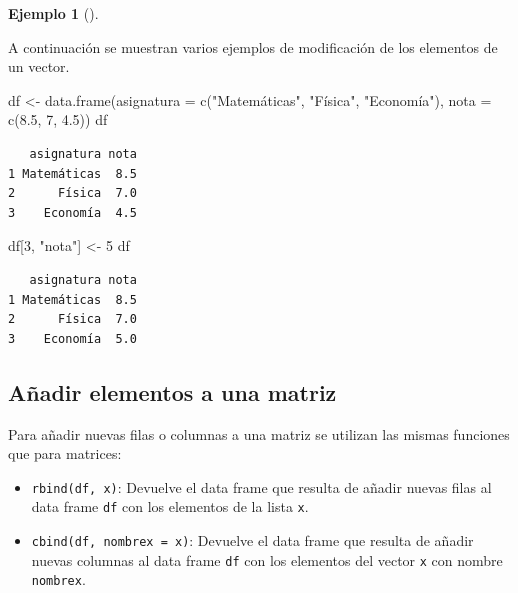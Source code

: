 \documentclass[
  a4paper,
]{scrreport}
\newenvironment{Shaded}{\begin{snugshade}}{\end{snugshade}}
\newcommand{\AttributeTok}[1]{\textcolor[rgb]{0.40,0.45,0.13}{#1}}
\newcommand{\DecValTok}[1]{\textcolor[rgb]{0.68,0.00,0.00}{#1}}
\newcommand{\FloatTok}[1]{\textcolor[rgb]{0.68,0.00,0.00}{#1}}
\newcommand{\FunctionTok}[1]{\textcolor[rgb]{0.28,0.35,0.67}{#1}}
\newcommand{\NormalTok}[1]{\textcolor[rgb]{0.00,0.23,0.31}{#1}}
\newcommand{\OtherTok}[1]{\textcolor[rgb]{0.00,0.23,0.31}{#1}}
\newcommand{\StringTok}[1]{\textcolor[rgb]{0.13,0.47,0.30}{#1}}
\providecommand{\tightlist}{%
  \setlength{\itemsep}{0pt}\setlength{\parskip}{0pt}}\usepackage{longtable,booktabs,array}
\theoremstyle{definition}
\theoremstyle{definition}
\newtheorem{example}{Ejemplo}[chapter]
\theoremstyle{remark}
\begin{document}
\leavevmode{}%
\begin{example}[]\label{exm-modificacion-data-frames}

A continuación se muestran varios ejemplos de modificación de los
elementos de un vector.

\begin{Shaded}
\begin{Highlighting}[]
\NormalTok{df }\OtherTok{\textless{}{-}} \FunctionTok{data.frame}\NormalTok{(}\AttributeTok{asignatura =} \FunctionTok{c}\NormalTok{(}\StringTok{"Matemáticas"}\NormalTok{, }\StringTok{"Física"}\NormalTok{, }\StringTok{"Economía"}\NormalTok{), }\AttributeTok{nota =} \FunctionTok{c}\NormalTok{(}\FloatTok{8.5}\NormalTok{, }\DecValTok{7}\NormalTok{, }\FloatTok{4.5}\NormalTok{))}
\NormalTok{df}
\end{Highlighting}
\end{Shaded}

\begin{verbatim}
   asignatura nota
1 Matemáticas  8.5
2      Física  7.0
3    Economía  4.5
\end{verbatim}

\begin{Shaded}
\begin{Highlighting}[]
\NormalTok{df[}\DecValTok{3}\NormalTok{, }\StringTok{"nota"}\NormalTok{] }\OtherTok{\textless{}{-}} \DecValTok{5}
\NormalTok{df}
\end{Highlighting}
\end{Shaded}

\begin{verbatim}
   asignatura nota
1 Matemáticas  8.5
2      Física  7.0
3    Economía  5.0
\end{verbatim}

\end{example}

\hypertarget{auxf1adir-elementos-a-una-matriz-1}{%
\subsection{Añadir elementos a una
matriz}\label{auxf1adir-elementos-a-una-matriz-1}}

Para añadir nuevas filas o columnas a una matriz se utilizan las mismas
funciones que para matrices:

\begin{itemize}
\tightlist
\item
  \texttt{rbind(df,\ x)}: Devuelve el data frame que resulta de añadir
  nuevas filas al data frame \texttt{df} con los elementos de la lista
  \texttt{x}.
\item
  \texttt{cbind(df,\ nombrex\ =\ x)}: Devuelve el data frame que resulta
  de añadir nuevas columnas al data frame \texttt{df} con los elementos
  del vector \texttt{x} con nombre \texttt{nombrex}.
\end{itemize}
\end{document}
